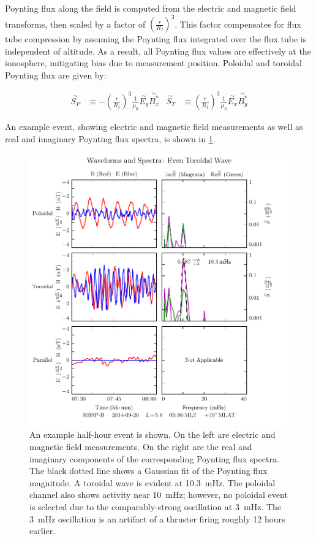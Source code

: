 \documentclass[draft,linenumbers]{agujournal}
\begin{document}
Poynting flux along the field is computed from the electric and magnetic field transforms, then scaled by a factor of $\left( \frac{r}{R_I} \right)^3$. This factor compensates for flux tube compression by assuming the Poynting flux integrated over the flux tube is independent of altitude. As a result, all Poynting flux values are effectively at the ionosphere, mitigating bias due to measurement position. Poloidal and toroidal Poynting flux are given by:
\begin{linenomath*}
\begin{align}
    \overset{\sim}{S_P} &\equiv -\left( \frac{r}{R_I} \right)^3\frac{1}{\mu_0} \overset{\sim}{E_y} \overset{\sim}{B_x^*} &
    \overset{\sim}{S_T} &\equiv  \left( \frac{r}{R_I} \right)^3\frac{1}{\mu_0} \overset{\sim}{E_x} \overset{\sim}{B_y^*}
\end{align}
\end{linenomath*}

An example event, showing electric and magnetic field measurements as well as real and imaginary Poynting flux spectra, is shown in \cref{fig_event}.

\begin{figure}
    \begin{center}
    \includegraphics[width=\textwidth]{figures/fig_event.pdf}
    \caption{
        An example half-hour event is shown. On the left are electric and magnetic field measurements. On the right are the real and imaginary components of the corresponding Poynting flux spectra. The black dotted line shows a Gaussian fit of the Poynting flux magnitude. A toroidal wave is evident at \SI{10.3}{\mHz}. The poloidal channel also shows activity near \SI{10}{\mHz}; however, no poloidal event is selected due to the comparably-strong oscillation at \SI{3}{\mHz}. The \SI{3}{\mHz} oscillation is an artifact of a thruster firing roughly 12 hours earlier.
    }
    \label{fig_event}
    \end{center}
\end{figure}
\end{document}
